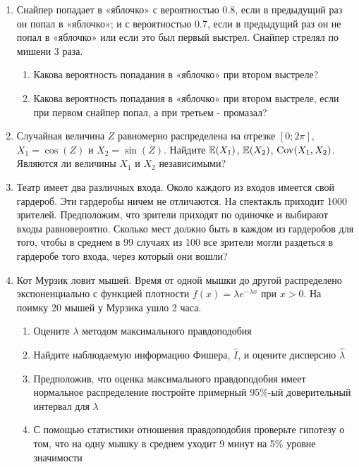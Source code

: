 \documentclass[12pt, a4paper]{article}\usepackage[]{graphicx}\usepackage[]{color}
\begin{document}
				\begin{enumerate}

					\item Снайпер попадает в «яблочко» с вероятностью 0.8, если в предыдущий раз он попал в «яблочко»; и с вероятностью 0.7, если в предыдущий раз он не попал в «яблочко» или если это был первый выстрел. Снайпер стрелял по мишени 3 раза.
					\begin{enumerate}
						\item Какова вероятность попадания в «яблочко» при втором выстреле?
						\item Какова вероятность попадания в «яблочко» при втором выстреле, если при первом снайпер попал, а при третьем - промазал?
					\end{enumerate}

					\item Случайная величина $Z$ равномерно распределена на отрезке  $[0;2\pi]$, $X_1=\cos(Z)$ и $X_2=\sin(Z)$. Найдите $\mathbb{E}(X_1)$, $\mathbb{E}(X_2)$, $\operatorname{Cov}(X_1,X_2)$. Являются ли величины $X_1$ и $X_2$ независимыми?

					\item Театр имеет два различных входа. Около каждого из входов имеется свой гардероб. Эти гардеробы ничем не отличаются.  На спектакль приходит 1000 зрителей. Предположим, что зрители приходят по одиночке и выбирают входы равновероятно. Сколько мест должно быть в каждом из гардеробов для того, чтобы в среднем в 99 случаях из 100 все зрители могли раздеться в гардеробе того входа, через который они вошли?

					\item Кот Мурзик ловит мышей. Время от одной мышки до другой распределено экспоненциально с функцией плотности $f(x)=\lambda e^{-\lambda x}$ при $x>0$. На поимку 20 мышей у Мурзика ушло 2 часа.
					\begin{enumerate}
						\item Оцените $\lambda$ методом максимального правдоподобия
						\item Найдите наблюдаемую информацию Фишера, $\hat{I}$, и оцените дисперсию $\hat{\lambda}$
						\item Предположив, что оценка максимального правдоподобия имеет нормальное распределение постройте примерный 95\%-ый доверительный интервал для $\lambda$
						\item С помощью статистики отношения правдоподобия проверьте гипотезу о том, что на одну мышку в среднем уходит 9 минут на 5\% уровне значимости
					\end{enumerate}


\end{enumerate}
\end{document}
